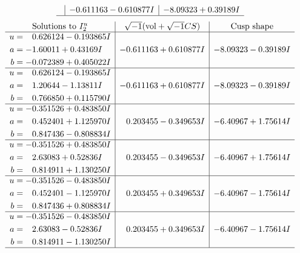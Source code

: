 \documentclass[1p]{elsarticle_modified}
\theoremstyle{definition}
\newcommand{\I}{\sqrt{-1}}
\begin{document}
$$\begin{array}{c|c|c}
 & -0.611163 - 0.610877 I & -8.09323 + 0.39189 I\\
 \hline 
 \end{array}$$\newpage$$\begin{array}{c|c|c}  
\text{Solutions to }I^u_{2}& \I (\text{vol} + \sqrt{-1}CS) & \text{Cusp shape}\\
 \hline 
\begin{aligned}
u &= \phantom{-}0.626124 - 0.193865 I \\
a &= -1.60011 + 0.43169 I \\
b &= -0.072389 + 0.405022 I\end{aligned}
 & -0.611163 + 0.610877 I & -8.09323 - 0.39189 I \\ \hline\begin{aligned}
u &= \phantom{-}0.626124 - 0.193865 I \\
a &= \phantom{-}1.20644 - 1.13811 I \\
b &= \phantom{-}0.766850 + 0.115790 I\end{aligned}
 & -0.611163 + 0.610877 I & -8.09323 - 0.39189 I \\ \hline\begin{aligned}
u &= -0.351526 + 0.483850 I \\
a &= \phantom{-}0.452401 + 1.125970 I \\
b &= \phantom{-}0.847436 - 0.808834 I\end{aligned}
 & \phantom{-}0.203455 - 0.349653 I & -6.40967 + 1.75614 I \\ \hline\begin{aligned}
u &= -0.351526 + 0.483850 I \\
a &= \phantom{-}2.63083 + 0.52836 I \\
b &= \phantom{-}0.814911 + 1.130250 I\end{aligned}
 & \phantom{-}0.203455 - 0.349653 I & -6.40967 + 1.75614 I \\ \hline\begin{aligned}
u &= -0.351526 - 0.483850 I \\
a &= \phantom{-}0.452401 - 1.125970 I \\
b &= \phantom{-}0.847436 + 0.808834 I\end{aligned}
 & \phantom{-}0.203455 + 0.349653 I & -6.40967 - 1.75614 I \\ \hline\begin{aligned}
u &= -0.351526 - 0.483850 I \\
a &= \phantom{-}2.63083 - 0.52836 I \\
b &= \phantom{-}0.814911 - 1.130250 I\end{aligned}
 & \phantom{-}0.203455 + 0.349653 I & -6.40967 - 1.75614 I\\
 \hline 
 \end{array}$$\newpage\newpage\renewcommand{\arraystretch}{1}
\end{document}
